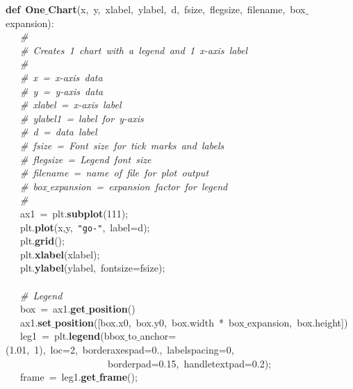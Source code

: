 \mbox{}\textbf{def}\ \textbf{One$\_$Chart}(x,\ y,\ xlabel,\ ylabel,\ d,\ fsize,\ flegsize,\ filename,\ box$\_$expansion): \\
\mbox{}\ \ \ \textit{\#} \\
\mbox{}\ \ \ \textit{\#\ Creates\ 1\ chart\ with\ a\ legend\ and\ 1\ x-axis\ label} \\
\mbox{}\ \ \ \textit{\#} \\
\mbox{}\ \ \ \textit{\#\ x\ =\ x-axis\ data} \\
\mbox{}\ \ \ \textit{\#\ y\ =\ y-axis\ data} \\
\mbox{}\ \ \ \textit{\#\ xlabel\ =\ x-axis\ label} \\
\mbox{}\ \ \ \textit{\#\ ylabel1\ =\ label\ for\ y-axis} \\
\mbox{}\ \ \ \textit{\#\ d\ =\ data\ label} \\
\mbox{}\ \ \ \textit{\#\ fsize\ =\ Font\ size\ for\ tick\ marks\ and\ labels} \\
\mbox{}\ \ \ \textit{\#\ flegsize\ =\ Legend\ font\ size} \\
\mbox{}\ \ \ \textit{\#\ filename\ =\ name\ of\ file\ for\ plot\ output} \\
\mbox{}\ \ \ \textit{\#\ box$\_$expansion\ =\ expansion\ factor\ for\ legend} \\
\mbox{}\ \ \ \textit{\#} \\
\mbox{}\ \ \ ax1\ =\ plt.\textbf{subplot}(111); \\
\mbox{}\ \ \ plt.\textbf{plot}(x,y,\ \texttt{"{}go-"{}},\ label=d); \\
\mbox{}\ \ \ plt.\textbf{grid}(); \\
\mbox{}\ \ \ plt.\textbf{xlabel}(xlabel); \\
\mbox{}\ \ \ plt.\textbf{ylabel}(ylabel,\ fontsize=fsize); \\
\mbox{}\ \ \  \\
\mbox{}\ \ \ \textit{\#\ Legend} \\
\mbox{}\ \ \ box\ =\ ax1.\textbf{get$\_$position}() \\
\mbox{}\ \ \ ax1.\textbf{set$\_$position}([box.x0,\ box.y0,\ box.width\ *\ box$\_$expansion,\ box.height]) \\
\mbox{}\ \ \ leg1\ =\ plt.\textbf{legend}(bbox$\_$to$\_$anchor=(1.01,\ 1),\ loc=2,\ borderaxespad=0.,\ labelspacing=0,\  \\
\mbox{}\ \ \ \ \ \ \ \ \ \ \ \ \ \ \ \ \ \ \ \ \ borderpad=0.15,\ handletextpad=0.2); \\
\mbox{}\ \ \ frame\ =\ leg1.\textbf{get$\_$frame}(); \\
